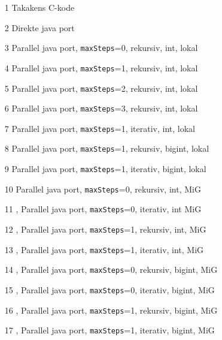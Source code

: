 \begin{itemize}
\item[1] Takakens C-kode
\item[2] Direkte java port
\item[3] Parallel java port, \texttt{maxSteps}=0, rekursiv, int, lokal
\item[4] Parallel java port, \texttt{maxSteps}=1, rekursiv, int, lokal
\item[5] Parallel java port, \texttt{maxSteps}=2, rekursiv, int, lokal
\item[6] Parallel java port, \texttt{maxSteps}=3, rekursiv, int, lokal
\item[7] Parallel java port, \texttt{maxSteps}=1, iterativ, int, lokal
\item[8] Parallel java port, \texttt{maxSteps}=1, rekursiv, bigint, lokal
\item[9] Parallel java port, \texttt{maxSteps}=1, iterativ, bigint, lokal
\item[10] Parallel java port, \texttt{maxSteps}=0, rekursiv, int, MiG
\item[11], Parallel java port, \texttt{maxSteps}=0, iterativ, int MiG
\item[12], Parallel java port, \texttt{maxSteps}=1, rekursiv, int, MiG
\item[13], Parallel java port, \texttt{maxSteps}=1, iterativ, int, MiG
\item[14], Parallel java port, \texttt{maxSteps}=0, rekursiv, bigint, MiG
\item[15], Parallel java port, \texttt{maxSteps}=0, iterativ, bigint, MiG
\item[16], Parallel java port, \texttt{maxSteps}=1, rekursiv, bigint, MiG
\item[17], Parallel java port, \texttt{maxSteps}=1, iterativ, bigint, MiG
\end{itemize}
